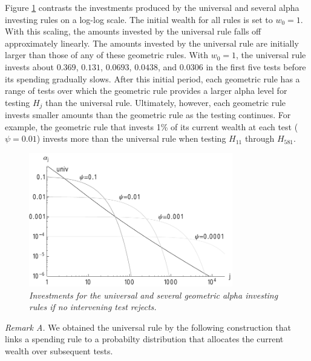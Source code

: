\documentclass[12pt]{article}
\begin{document}
 
 Figure \ref{fig:rules} contrasts the investments produced by the universal and
 several alpha investing rules on a log-log scale.  The initial wealth for all
 rules is set to $w_0 = 1$.  With this scaling, the amounts invested by the
 universal rule falls off approximately linearly.  The amounts invested by the
 universal rule are initially larger than those of any of these geometric rules.
  With $w_0=1$, the universal rule invests about $0.369$, $0.131$, $0.0693$,
 $0.0438$, and $0.0306$ in the first five tests before its spending gradually
 slows. After this initial period, each geometric rule has a range of tests over
 which the geometric rule provides a larger alpha level for testing $H_j$ than
 the universal rule.  Ultimately, however, each geometric rule invests smaller
 amounts than the geometric rule as the testing continues.  For example, the
 geometric rule that invests 1\% of its current wealth at each test
 ($\psi=0.01$) invests more than the universal rule when testing $H_{11}$
 through $H_{581}$. 


 \begin{figure}
 \caption{ \label{fig:rules} \sl Investments for the universal and several
 geometric alpha investing rules if no intervening test rejects. }

 \centerline{
 \vspace{0.1in}
 \includegraphics[width=3.5in]{figures/rules} }
 \vspace{0.2in}
 \end{figure}


 \vspace*{0.2in}
 \noindent
 {\it Remark A. }  We obtained the universal rule by the following construction
 that links a spending rule to a probabilty distribution that allocates the
 current wealth over subsequent tests.   
\end{document}
